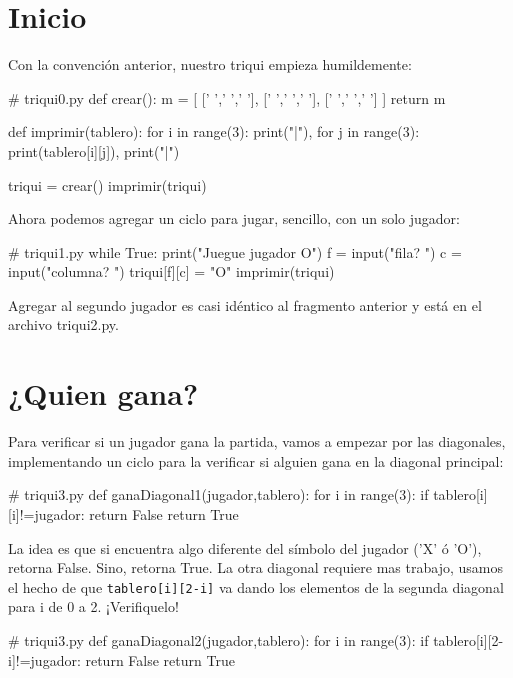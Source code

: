 \section{Inicio}

Con la convención anterior, nuestro triqui empieza humildemente:

\begin{pythoncode}
# triqui0.py
def crear():
    m =  [ [' ',' ',' '],
           [' ',' ',' '],
           [' ',' ',' '] ]
    return m


def imprimir(tablero):
    for i in range(3):
        print("|"),
        for j in range(3):
            print(tablero[i][j]),
        print("|")
        
triqui = crear()
imprimir(triqui)
\end{pythoncode}

Ahora podemos agregar un ciclo para jugar, sencillo, con un solo jugador:\pagebreak{}

\begin{pythoncode}
# triqui1.py
while True:
    print("Juegue jugador O")
    f = input("fila? ")
    c = input("columna? ")
    triqui[f][c] = "O"
    imprimir(triqui)
\end{pythoncode}

Agregar al segundo jugador es casi idéntico al fragmento anterior
y está en el archivo triqui2.py.

\section{¿Quien gana?}

Para verificar si un jugador gana la partida, vamos a empezar por
las diagonales, implementando un ciclo para la verificar si alguien
gana en la diagonal principal:

\begin{pythoncode}
# triqui3.py
def ganaDiagonal1(jugador,tablero):
    for i in range(3):
        if tablero[i][i]!=jugador:
            return False
    return True
\end{pythoncode}

La idea es que si encuentra algo diferente del símbolo del jugador
('X' ó 'O'), retorna False. Sino, retorna True. La otra diagonal requiere
mas trabajo, usamos el hecho de que \texttt{tablero{[}i{]}{[}2-i{]}}
va dando los elementos de la segunda diagonal para i de 0 a 2. ¡Verifiquelo!

\begin{pythoncode}
# triqui3.py
def ganaDiagonal2(jugador,tablero):
    for i in range(3):
        if tablero[i][2-i]!=jugador:
            return False
    return True
\end{pythoncode}

